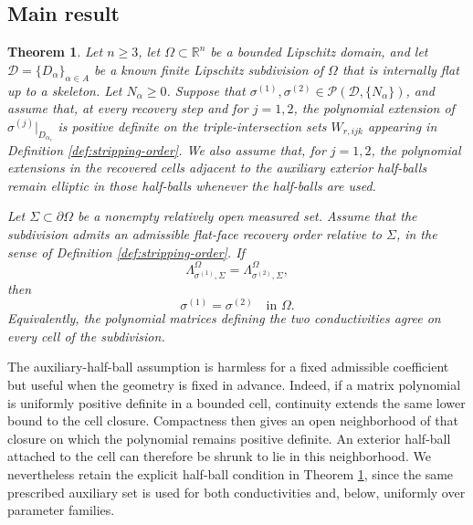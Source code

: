 \documentclass[10pt,a4paper]{amsart}
\newtheorem{theorem}{Theorem}[section]
\newcommand{\R}{\mathbb R}
\newcommand{\DN}{\Lambda}
\begin{document}
\subsection{Main result}


\begin{theorem}
\label{thm:main}
Let \(n\ge3\), let \(\Omega\subset\R^n\) be a bounded Lipschitz domain, and let
\(\mathcal D=\{D_\alpha\}_{\alpha\in A}\) be a known finite Lipschitz
subdivision of \(\Omega\) that is internally flat up to a skeleton.  Let
\(N_\alpha\ge0\).  Suppose that
\(\sigma^{(1)},\sigma^{(2)}\in\mathcal P(\mathcal D,\{N_\alpha\})\), and assume
that, at every recovery step and for \(j=1,2\), the polynomial extension of
\(\sigma^{(j)}|_{D_{\alpha_r}}\) is positive definite on the triple-intersection
sets \(W_{r,ijk}\) appearing in Definition \ref{def:stripping-order}.  We also
  assume that, for \(j=1,2\), the polynomial extensions in the recovered cells
  adjacent to the auxiliary exterior half-balls remain elliptic in those
  half-balls whenever the half-balls are used.

Let \(\Sigma\subset\partial\Omega\) be a nonempty relatively open measured set.
Assume that the subdivision admits an admissible flat-face recovery order
relative to \(\Sigma\), in the sense of Definition \ref{def:stripping-order}.
If
\begin{equation}
  \DN^\Omega_{\sigma^{(1)},\Sigma}
  =\DN^\Omega_{\sigma^{(2)},\Sigma},
  \label{eq:outer-dn-equality}
\end{equation}
then
\begin{equation}
  \sigma^{(1)}=\sigma^{(2)}\quad\text{in }\Omega.
\end{equation}
Equivalently, the polynomial matrices defining the two conductivities agree on
every cell of the subdivision.

\end{theorem}


The auxiliary-half-ball assumption is harmless for a fixed admissible
coefficient but useful when the geometry is fixed in advance.  Indeed, if a
matrix polynomial is uniformly positive definite in a bounded cell, continuity
extends the same lower bound to the cell closure.  Compactness then gives an
open neighborhood of that closure on which the polynomial remains positive
definite.  An exterior half-ball attached to the cell can therefore be shrunk
to lie in this neighborhood.  We nevertheless retain the explicit half-ball
condition in Theorem \ref{thm:main}, since the same prescribed auxiliary set is
used for both conductivities and, below, uniformly over parameter families.
\end{document}

